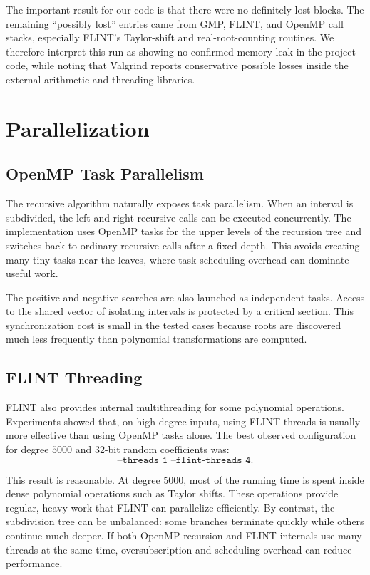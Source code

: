 \documentclass[letterpaper]{article}
\begin{document}
The important result for our code is that there were no definitely lost
blocks. The remaining ``possibly lost'' entries came from GMP, FLINT, and
OpenMP call stacks, especially FLINT's Taylor-shift and real-root-counting
routines. We therefore interpret this run as showing no confirmed memory leak
in the project code, while noting that Valgrind reports conservative possible
losses inside the external arithmetic and threading libraries.

\section{Parallelization}

\subsection{OpenMP Task Parallelism}

The recursive algorithm naturally exposes task parallelism. When an interval
is subdivided, the left and right recursive calls can be executed concurrently.
The implementation uses OpenMP tasks for the upper levels of the recursion
tree and switches back to ordinary recursive calls after a fixed depth. This
avoids creating many tiny tasks near the leaves, where task scheduling overhead
can dominate useful work.

The positive and negative searches are also launched as independent tasks.
Access to the shared vector of isolating intervals is protected by a critical
section. This synchronization cost is small in the tested cases because roots
are discovered much less frequently than polynomial transformations are
computed.

\subsection{FLINT Threading}

FLINT also provides internal multithreading for some polynomial operations.
Experiments showed that, on high-degree inputs, using FLINT threads is usually
more effective than using OpenMP tasks alone. The best observed configuration
for degree $5000$ and 32-bit random coefficients was:
\[
  \texttt{--threads 1 --flint-threads 4}.
\]

This result is reasonable. At degree $5000$, most of the running time is spent
inside dense polynomial operations such as Taylor shifts. These operations
provide regular, heavy work that FLINT can parallelize efficiently. By
contrast, the subdivision tree can be unbalanced: some branches terminate
quickly while others continue much deeper. If both OpenMP recursion and FLINT
internals use many threads at the same time, oversubscription and scheduling
overhead can reduce performance.
\end{document}
